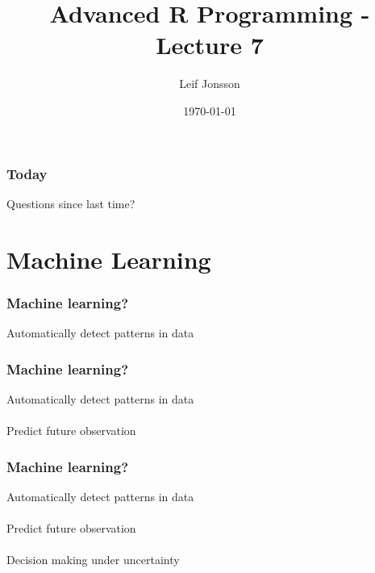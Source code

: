 \documentclass{beamer}
\title[Lecture 7]{Advanced R Programming - Lecture 7} %
\author{Leif Jonsson} %
\institute[STIMA LiU] %
{
Link\"{o}ping University \\ %
\medskip
\textit{leif.jonsson@ericsson.com\\leif.r.jonsson@liu.se} %
}
\date{\today} %
\begin{document}
\begin{frame}
\titlepage %
\end{frame}

\begin{frame}
\frametitle{Today} %
\tableofcontents %
\end{frame}


\begin{frame}
	\Huge{\centerline{Questions since last time?}}
\end{frame}

\section{Machine Learning}

\begin{frame}
	\frametitle{Machine learning?}
	\begin{center}
	Automatically detect patterns in data
	\end{center}
\end{frame}

\begin{frame}
	\frametitle{Machine learning?}
	\begin{center}
		Automatically detect patterns in data\\~\\
		Predict future observation
	\end{center}
\end{frame}

\begin{frame}
	\frametitle{Machine learning?}
	\begin{center}
		Automatically detect patterns in data\\~\\
		Predict future observation\\~\\
		Decision making under uncertainty
	\end{center}
\end{frame}
\end{document}
